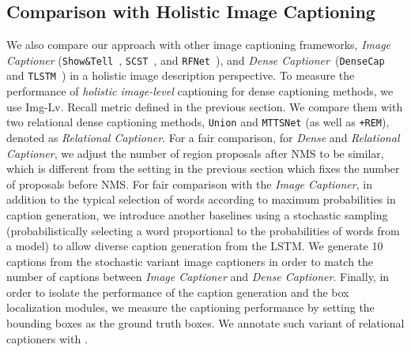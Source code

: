 \subsection{{Comparison with} Holistic Image Captioning}
We also compare our approach with other image captioning frameworks, \emph{Image Captioner} {(\texttt{Show\&Tell}~\cite{vinyals2015show}, \texttt{SCST}~\cite{rennie2017self}, and \texttt{RFNet}~\cite{jiang2018recurrent}}), and \emph{Dense Captioner}~(\texttt{DenseCap}~\cite{johnson2016densecap} {and \texttt{TLSTM}~\cite{Yang_2017_CVPR}}) in a holistic image description perspective.
To measure the performance of \emph{holistic image-level} captioning for dense captioning methods, we use Img-Lv. Recall metric {defined in the previous section}.
We compare them with two relational dense captioning methods, \texttt{Union} and \texttt{MTTSNet} ({as well as \texttt{+REM}}), denoted as \emph{Relational Captioner}.
For a fair comparison, for \emph{Dense} and \emph{Relational Captioner}, we adjust the number of region proposals after NMS to be similar, which is different from the setting in the previous section which fixes the number of proposals before NMS.
{For fair comparison with the \emph{Image Captioner}, in addition to  {the typical selection of words according to maximum probabilities in} 
caption generation,
we introduce another baselines using} a stochastic sampling (probabilistically selecting a word 
{proportional to}
{the probabilities of words} from a model) to 
{allow diverse caption generation from the LSTM.}
We generate 10 captions from {the stochastic variant image captioners} {in order to match the number of captions between \emph{Image Captioner} and \emph{Dense Captioner}}.
{Finally, in order to isolate the performance of the caption generation and the box localization modules, we measure the captioning performance by setting the bounding boxes as the ground truth boxes. 
We annotate such variant of relational captioners with .}









